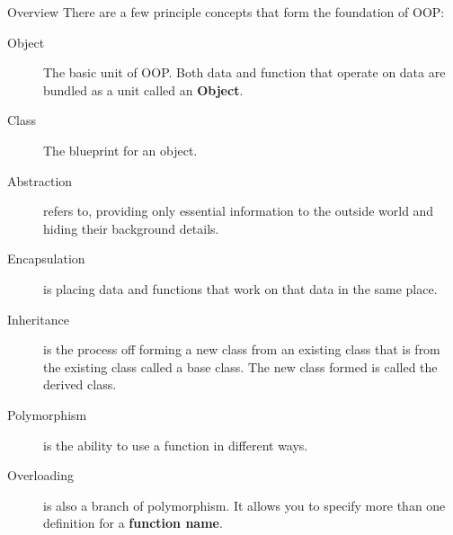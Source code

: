 \documentclass[../lecture5-objectorientation.tex]{subfiles}
\begin{document}
\begin{frame}[fragile]{Overview}
    There are a few principle concepts that form the foundation of OOP:
    \begin{description}
        \item[Object] The basic unit of OOP. Both data and function that operate on data are bundled as a unit called an \textbf{Object}.

        \item[Class] The blueprint for an object.

        \item[Abstraction] refers to, providing only essential information to the outside world and hiding their background details.

        \item[Encapsulation] is placing data and functions that work on that data in the same place.

        \item[Inheritance] is the process off forming a new class from an existing class that is from the existing class called a base class. The new class formed is called the derived class.

        \item[Polymorphism] is the ability to use a function in different ways.

        \item[Overloading] is also a branch of polymorphism. It allows you to specify more than one definition for a \textbf{function name}.
    \end{description}
\end{frame}

\end{document}
